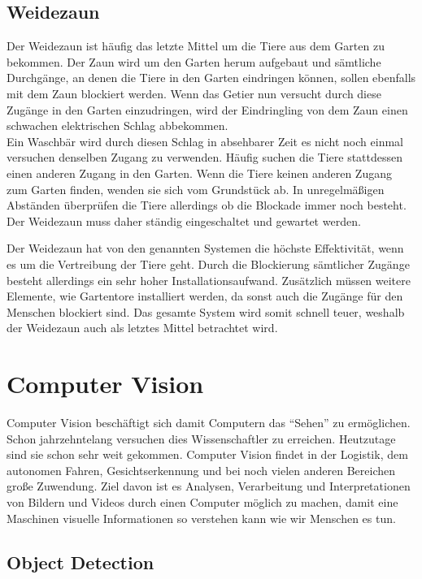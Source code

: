 \subsection{Weidezaun}

Der Weidezaun ist häufig das letzte Mittel um die Tiere aus dem Garten zu bekommen. Der Zaun wird um den Garten herum aufgebaut und sämtliche Durchgänge, an denen die Tiere in den Garten eindringen  können, sollen ebenfalls mit dem Zaun blockiert werden. Wenn das Getier nun versucht durch diese Zugänge in den Garten einzudringen, wird der Eindringling von dem Zaun einen schwachen elektrischen Schlag abbekommen.
\\
Ein Waschbär wird durch diesen Schlag in absehbarer Zeit es nicht noch einmal versuchen denselben Zugang zu verwenden. Häufig suchen die Tiere stattdessen einen anderen Zugang in den Garten. Wenn die Tiere keinen anderen Zugang zum Garten finden, wenden sie sich vom Grundstück ab. In unregelmäßigen Abständen überprüfen die Tiere allerdings ob die Blockade immer noch besteht. Der Weidezaun muss daher ständig eingeschaltet und gewartet werden.\cite{anti_wasch}

Der Weidezaun hat von den genannten Systemen die höchste Effektivität, wenn es um die Vertreibung der Tiere geht. Durch die Blockierung sämtlicher Zugänge besteht allerdings ein sehr hoher Installationsaufwand. Zusätzlich müssen weitere Elemente, wie Gartentore installiert werden, da sonst auch die Zugänge für den Menschen blockiert sind. Das gesamte System wird somit schnell teuer, weshalb der Weidezaun auch als letztes Mittel betrachtet wird.


\section{Computer Vision}

Computer Vision beschäftigt sich damit Computern das \enquote{Sehen} zu ermöglichen. Schon jahrzehntelang versuchen dies Wissenschaftler zu erreichen. Heutzutage sind sie schon sehr weit gekommen. Computer Vision findet in der Logistik, dem autonomen Fahren, Gesichtserkennung und bei noch vielen anderen Bereichen große Zuwendung. Ziel davon ist es Analysen, Verarbeitung und Interpretationen von Bildern und Videos durch einen Computer möglich zu machen, damit eine Maschinen visuelle Informationen so verstehen kann wie wir Menschen es tun. \cite{cv_Szeliski}

\subsection{Object Detection}

